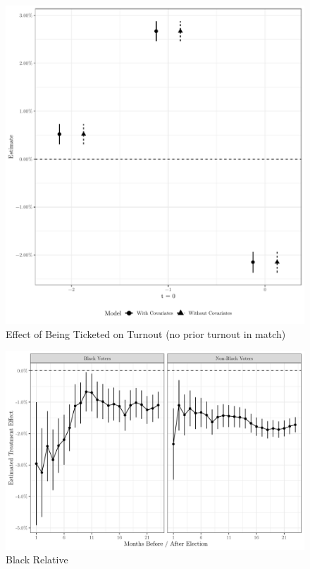 \documentclass[
  12pt,
]{article}
\begin{document}
\begin{figure}[H]

{\centering \includegraphics{compile_files/figure-latex/event-study-no-prior-1} 

}

\caption{\label{fig:did-1}Effect of Being Ticketed on Turnout (no prior turnout in match)}\label{fig:event-study-no-prior}
\end{figure}

\begin{figure}[H]

{\centering \includegraphics{compile_files/figure-latex/windows-1} 

}

\caption{\label{fig:did-1}Black Relative}\label{fig:windows}
\end{figure}
\end{document}
